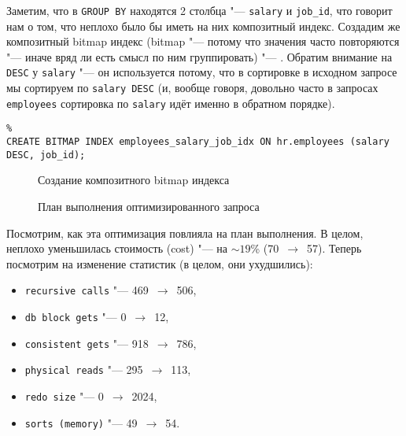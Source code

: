 Заметим, что в \texttt{GROUP BY} находятся 2 столбца "--- \texttt{salary} и \texttt{job\_id}, что говорит нам о том, что неплохо было бы иметь на них композитный индекс.
Создадим же композитный bitmap индекс (bitmap "--- потому что значения часто повторяются "--- иначе вряд ли есть смысл по ним группировать) "--- .
Обратим внимание на \texttt{DESC} у \texttt{salary} "--- он используется потому, что в сортировке в исходном запросе мы сортируем по \texttt{salary~DESC} (и, вообще говоря, довольно часто в запросах \texttt{employees} сортировка по \texttt{salary} идёт именно в обратном порядке).

\begin{verbatim}%
CREATE BITMAP INDEX employees_salary_job_idx ON hr.employees (salary DESC, job_id);
\end{verbatim}
\begin{figure}[H]%
  \caption{Создание композитного bitmap индекса}
  \label{oh-hey-babe}
\end{figure}

\begin{figure}[H]%
  \caption{План выполнения оптимизированного запроса}
  \label{fig-task-5-bitmap-composite-plan}
\end{figure}

\pagebreak

Посмотрим, как эта оптимизация повлияла на план выполнения. В целом, неплохо уменьшилась стоимость (cost) "--- на $\sim 19$\% (70~$\to$~57).
Теперь посмотрим на изменение статистик (в целом, они ухудшились):
\begin{itemize}%
  \item \texttt{recursive calls} "--- 469~$\to$~506,
  \item \texttt{db block gets} "--- 0~$\to$~12,
  \item \texttt{consistent gets} "--- 918~$\to$~786,
  \item \texttt{physical reads} "--- 295~$\to$~113,
  \item \texttt{redo size} "--- 0~$\to$~2024,
  \item \texttt{sorts (memory)} "--- 49~$\to$~54.
\end{itemize}
